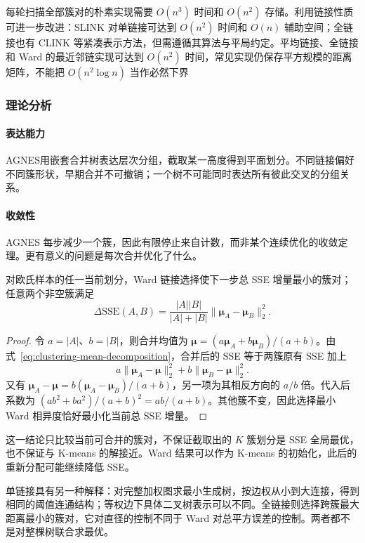 每轮扫描全部簇对的朴素实现需要 $O(n^3)$ 时间和 $O(n^2)$ 存储。利用链接性质可进一步改进：SLINK 对单链接可达到 $O(n^2)$ 时间和 $O(n)$ 辅助空间；全链接也有 CLINK 等紧凑表示方法，但需遵循其算法与平局约定。平均链接、全链接和 Ward 的最近邻链实现可达到 $O(n^2)$ 时间，常见实现仍保存平方规模的距离矩阵，不能把 $O(n^2\log n)$ 当作必然下界

\subsubsection{理论分析}

\paragraph{表达能力}
AGNES用嵌套合并树表达层次分组，截取某一高度得到平面划分。不同链接偏好不同簇形状，早期合并不可撤销；一个树不可能同时表达所有彼此交叉的分组关系。

\paragraph{收敛性}
AGNES 每步减少一个簇，因此有限停止来自计数，而非某个连续优化的收敛定理。更有意义的问题是每次合并优化了什么。

\begin{theorem}
 \label{thm:clustering-ward}
 对欧氏样本的任一当前划分，Ward 链接选择使下一步总 SSE 增量最小的簇对；任意两个非空簇满足
 \[
 \Delta\mathrm{SSE}(A,B)
 =\frac{|A||B|}{|A|+|B|}
   \lVert\bm{\mu}_A-\bm{\mu}_B\rVert_2^2.
 \]
\end{theorem}
\begin{proof}
令 $a=|A|$、$b=|B|$，则合并均值为 $\bm{\mu}=(a\bm{\mu}_A+b\bm{\mu}_B)/(a+b)$。由式~\eqref{eq:clustering-mean-decomposition}，合并后的 SSE 等于两簇原有 SSE 加上
\[
 a\lVert\bm{\mu}_A-\bm{\mu}\rVert_2^2+
 b\lVert\bm{\mu}_B-\bm{\mu}\rVert_2^2.
\]
又有 $\bm{\mu}_A-\bm{\mu}=b(\bm{\mu}_A-\bm{\mu}_B)/(a+b)$，另一项为其相反方向的 $a/b$ 倍。代入后系数为 $(ab^2+ba^2)/(a+b)^2=ab/(a+b)$。其他簇不变，因此选择最小 Ward 相异度恰好最小化当前总 SSE 增量。
\end{proof}

这一结论只比较当前可合并的簇对，不保证截取出的 $K$ 簇划分是 SSE 全局最优，也不保证与 K-means 的解接近。Ward 结果可以作为 K-means 的初始化，此后的重新分配可能继续降低 SSE。

单链接具有另一种解释：对完整加权图求最小生成树，按边权从小到大连接，得到相同的阈值连通结构；等权边下具体二叉树表示可以不同。全链接则选择跨簇最大距离最小的簇对，它对直径的控制不同于 Ward 对总平方误差的控制。两者都不是对整棵树联合求最优。

